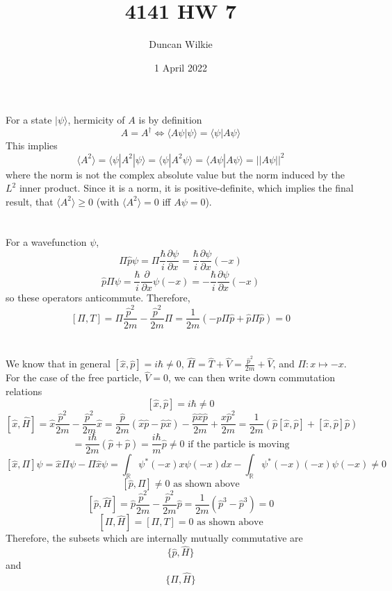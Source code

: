 \documentclass{article}
\title{4141 HW 7}
\author{Duncan Wilkie}
\date{1 April 2022}
\begin{document}
\maketitle

\section{}
For a state $|\psi\rangle$, hermicity of $A$ is by definition
\[A=A^{\dagger}\Leftrightarrow\langle A\psi | \psi\rangle={\langle \psi | A\psi \rangle}\]
This implies
\[\langle A^{2} \rangle=\langle \psi| A^{2}|\psi \rangle=\langle \psi | A^{2}\psi \rangle=\langle A\psi | A\psi \rangle=||A\psi||^{2}\]
where the norm is not the complex absolute value but the norm induced by the $L^{2}$ inner product. Since it is a norm, it is positive-definite, which implies the final result, that $\langle A^{2} \rangle \geq 0$ (with $\langle A^{2} \rangle=0$ iff $A\psi=0$).

\section{}
For a wavefunction $\psi$,
\[\Pi \hat{p}\psi = \Pi\frac{\hbar}{i}\frac{\partial \psi}{\partial x}=\frac{\hbar}{i}\frac{\partial\psi}{\partial x}(-x)\]
\[\hat{p}\Pi\psi=\frac{\hbar}{i}\frac{\partial }{\partial x}\psi(-x)=-\frac{\hbar}{i}\frac{\partial \psi}{\partial x}(-x)\]
so these operators anticommute.
Therefore,
\[[\Pi,T]=\Pi\frac{\hat{p}^{2}}{2m}-\frac{\hat{p}^{2}}{2m}\Pi=\frac{1}{2m}\left( -\hat{p}\Pi\hat{p} + \hat{p}\Pi\hat{p}\right)=0\]

\section{}
We know that in general $[\hat{x},\hat{p}]=i\hbar\neq 0$, $\hat{H}=\hat{T}+\hat{V}=\frac{\hat{p}^{2}}{2m}+\hat{V}$, and $\Pi: x\mapsto -x$. For the case of the free particle, $\hat{V}=0$, we can then write down commutation relations
\[[\hat{x},\hat{p}]=i\hbar\neq 0\]
\[[\hat{x},\hat{H}]=\hat{x}\frac{\hat{p}^{2}}{2m}-\frac{\hat{p}^{2}}{2m}\hat{x}=\frac{\hat{p}}{2m}\left( \hat{x}\hat{p}-\hat{p}\hat{x} \right)-\frac{\hat{p}\hat{x}\hat{p}}{2m}+\frac{x\hat{p}^{2}}{2m}=\frac{1}{2m}\left( \hat{p}[\hat{x},\hat{p}] + [\hat{x},\hat{p}]\hat{p} \right)\]
\[=\frac{i\hbar}{2m}\left( \hat{p}+\hat{p} \right)=\frac{i\hbar}{m}\hat{p}\neq 0 \textrm{ if the particle is moving}\]
\[[\hat{x},\Pi]\psi=\hat{x}\Pi\psi-\Pi\hat{x}\psi=\int_{\mathbb{R}}\psi^{*}(-x)x\psi(-x)dx-\int_{\mathbb{R}}\psi^{*}(-x)(-x)\psi(-x)\neq 0\]
\[[\hat{p},\Pi]\neq 0 \textrm{ as shown above}\]
\[[\hat{p}, \hat{H}]=\hat{p}\frac{\hat{p}^{2}}{2m}-\frac{\hat{p}^{2}}{2m}\hat{p}=\frac{1}{2m}\left( \hat{p}^{3}-\hat{p}^{3} \right)=0\]
\[[\Pi,\hat{H}]=[\Pi,T]=0 \textrm{ as shown above}\]
Therefore, the subsets which are internally mutually commutative are
\[\{\hat{p},\hat{H}\}\]
and
\[\{\Pi,\hat{H}\}\]
\end{document}
